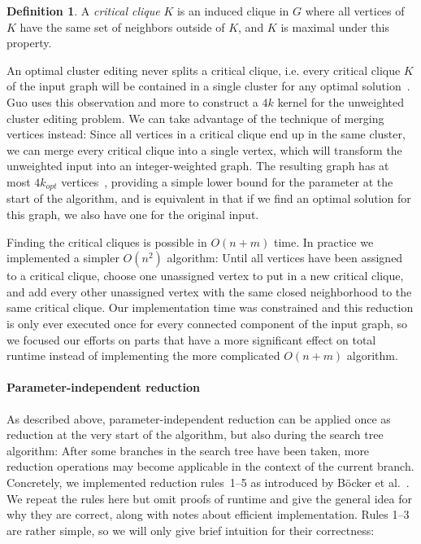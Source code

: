 \documentclass[12pt,oneside,english,parskip=full,headings=small]{scrbook}
\theoremstyle{definition}
\newtheorem{definition}[theorem]{Definition}
\begin{document}
\begin{definition}
	A \emph{critical clique} $K$ is an induced clique in $G$ where all vertices of $K$ have the same
	set of neighbors outside of $K$, and $K$ is maximal under this property. 
\end{definition}

An optimal cluster editing never splits a critical clique, i.e. every critical clique $K$ of the
input graph will be contained in a single cluster for any optimal solution~\cite{Guo}. Guo uses this
observation and more to construct a $4k$ kernel for the unweighted cluster editing problem. We can
take advantage of the technique of merging vertices instead: Since all vertices in a critical clique
end up in the same cluster, we can merge every critical clique into a single vertex, which will
transform the unweighted input into an integer-weighted graph. The resulting graph has at most
$4k_{opt}$ vertices~\cite{GoingWeighted, Guo}, providing a simple lower bound for the parameter at
the start of the algorithm, and is equivalent in that if we find an optimal solution for this graph,
we also have one for the original input.

Finding the critical cliques is possible in $O(n + m)$ time. In practice we implemented a simpler
$O(n^2)$ algorithm: Until all vertices have been assigned to a critical clique, choose one
unassigned vertex to put in a new critical clique, and add every other unassigned vertex with the
same closed neighborhood to the same critical clique. Our implementation time was constrained and
this reduction is only ever executed once for every connected component of the input graph, so we
focused our efforts on parts that have a more significant effect on total runtime instead of
implementing the more complicated $O(n + m)$ algorithm.

\paragraph{Parameter-independent reduction} As described above, parameter-independent reduction can
be applied once as reduction at the very start of the algorithm, but also during the search tree
algorithm: After some branches in the search tree have been taken, more reduction operations may
become applicable in the context of the current branch. Concretely, we implemented reduction
rules~1--5 as introduced by Böcker et al.~\cite{ExactAlgos}. We repeat the rules here but omit
proofs of runtime and give the general idea for why they are correct, along with notes about
efficient implementation. Rules 1--3 are rather simple, so we will only give brief intuition for
their correctness:
\end{document}
